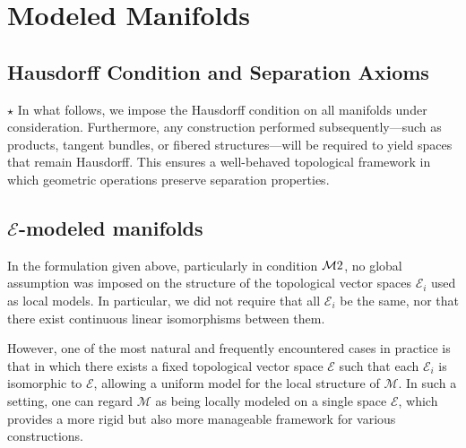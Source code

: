 \section{Modeled Manifolds}
\subsection*{Hausdorff Condition and Separation Axioms}
$\star$ In what follows, we impose the Hausdorff condition on all manifolds under consideration. Furthermore, any construction performed subsequently—such as products, tangent bundles, or fibered structures—will be required to yield spaces that remain Hausdorff. This ensures a well-behaved topological framework in which geometric operations preserve separation properties.

\subsection{\(\mathcal{E}\)-modeled manifolds}

In the formulation given above, particularly in condition $\mathcal{M}2$, no global assumption was imposed on the structure of the topological vector spaces $\mathcal{E}_i$ used as local models. In particular, we did not require that all $\mathcal{E}_i$ be the same, nor that there exist continuous linear isomorphisms between them.

However, one of the most natural and frequently encountered cases in practice is that in which there exists a fixed topological vector space $\mathcal{E}$ such that each $\mathcal{E}_i$ is isomorphic to $\mathcal{E}$, allowing a uniform model for the local structure of $\mathcal{M}$. In such a setting, one can regard $\mathcal{M}$ as being locally modeled on a single space $\mathcal{E}$, which provides a more rigid but also more manageable framework for various constructions.




